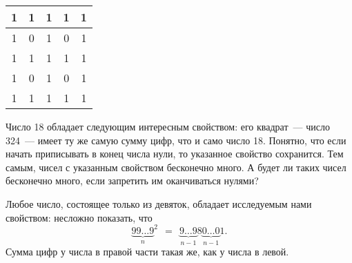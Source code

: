 \begin{enumerate}
	\begin{center} \begin{tabular}{c|c|c|c|c}
		1 & 1 & 1 & 1 & 1 \\ \hline
		1 & 0 & 1 & 0 & 1 \\ \hline
		1 & 1 & 1 & 1 & 1 \\ \hline
		1 & 0 & 1 & 0 & 1 \\ \hline
		1 & 1 & 1 & 1 & 1
	\end{tabular} \end{center}

	\itC Число 18 обладает следующим интересным свойством: его квадрат~— число 324~— имеет ту же самую сумму цифр, что и само число 18. Понятно, что если начать приписывать в конец числа нули, то указанное свойство сохранится. Тем самым, чисел с указанным свойством бесконечно много. А будет ли таких чисел бесконечно много, если запретить им оканчиваться нулями?
	
	\itr Любое число, состоящее только из девяток, обладает исследуемым нами свойством: несложно показать, что
	$${\underbrace{99\ldots 9}_{n}}^2\ \ =\ \ 
		\underbrace{9\ldots 9}_{n-1}8\underbrace{0\ldots 0}_{n-1}1.$$
	Сумма цифр у числа в правой части такая же, как у числа в левой.

\end{enumerate}


